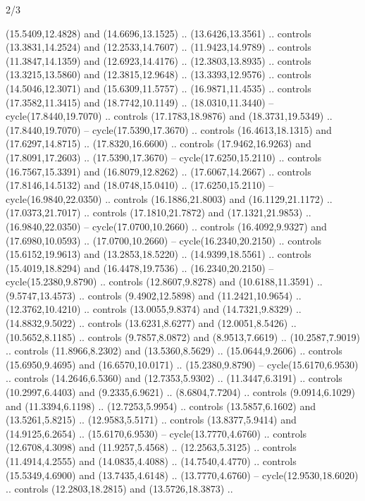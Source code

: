 \begin{flagdescription}{2/3}
\begin{scope}[yshift=\flagwidth,scale=\flagwidth/1241.93737]
\begin{scope}[y=-1mm, x=1mm,draw=gold,fill=blue,line join=miter,miter limit=4,line width=1.8\lw]
\begin{scope}[y=1mm, x=1mm, yscale=-1,shift={(573.68mm+\str,145.75)}]
\begin{scope}[scale=1.35,shift={(-9,-3)}]
\begin{scope}[scale=0.55]
\begin{scope}[scale=1.333]
    (15.5409,12.4828) and (14.6696,13.1525) .. (13.6426,13.3561) .. controls
    (13.3831,14.2524) and (12.2533,14.7607) .. (11.9423,14.9789) .. controls
    (11.3847,14.1359) and (12.6923,14.4176) .. (12.3803,13.8935) .. controls
    (13.3215,13.5860) and (12.3815,12.9648) .. (13.3393,12.9576) .. controls
    (14.5046,12.3071) and (15.6309,11.5757) .. (16.9871,11.4535) .. controls
    (17.3582,11.3415) and (18.7742,10.1149) .. (18.0310,11.3440) --
    cycle(17.8440,19.7070) .. controls (17.1783,18.9876) and (18.3731,19.5349) ..
    (17.8440,19.7070) -- cycle(17.5390,17.3670) .. controls (16.4613,18.1315) and
    (17.6297,14.8715) .. (17.8320,16.6600) .. controls (17.9462,16.9263) and
    (17.8091,17.2603) .. (17.5390,17.3670) -- cycle(17.6250,15.2110) .. controls
    (16.7567,15.3391) and (16.8079,12.8262) .. (17.6067,14.2667) .. controls
    (17.8146,14.5132) and (18.0748,15.0410) .. (17.6250,15.2110) --
    cycle(16.9840,22.0350) .. controls (16.1886,21.8003) and (16.1129,21.1172) ..
    (17.0373,21.7017) .. controls (17.1810,21.7872) and (17.1321,21.9853) ..
    (16.9840,22.0350) -- cycle(17.0700,10.2660) .. controls (16.4092,9.9327) and
    (17.6980,10.0593) .. (17.0700,10.2660) -- cycle(16.2340,20.2150) .. controls
    (15.6152,19.9613) and (13.2853,18.5220) .. (14.9399,18.5561) .. controls
    (15.4019,18.8294) and (16.4478,19.7536) .. (16.2340,20.2150) --
    cycle(15.2380,9.8790) .. controls (12.8607,9.8278) and (10.6188,11.3591) ..
    (9.5747,13.4573) .. controls (9.4902,12.5898) and (11.2421,10.9654) ..
    (12.3762,10.4210) .. controls (13.0055,9.8374) and (14.7321,9.8329) ..
    (14.8832,9.5022) .. controls (13.6231,8.6277) and (12.0051,8.5426) ..
    (10.5652,8.1185) .. controls (9.7857,8.0872) and (8.9513,7.6619) ..
    (10.2587,7.9019) .. controls (11.8966,8.2302) and (13.5360,8.5629) ..
    (15.0644,9.2606) .. controls (15.6950,9.4695) and (16.6570,10.0171) ..
    (15.2380,9.8790) -- cycle(15.6170,6.9530) .. controls (14.2646,6.5360) and
    (12.7353,5.9302) .. (11.3447,6.3191) .. controls (10.2997,6.4403) and
    (9.2335,6.9621) .. (8.6804,7.7204) .. controls (9.0914,6.1029) and
    (11.3394,6.1198) .. (12.7253,5.9954) .. controls (13.5857,6.1602) and
    (13.5261,5.8215) .. (12.9583,5.5171) .. controls (13.8377,5.9414) and
    (14.9125,6.2654) .. (15.6170,6.9530) -- cycle(13.7770,4.6760) .. controls
    (12.6708,4.3098) and (11.9257,5.4568) .. (12.2563,5.3125) .. controls
    (11.4914,4.2555) and (14.0835,4.4088) .. (14.7540,4.4770) .. controls
    (15.5349,4.6900) and (13.7435,4.6148) .. (13.7770,4.6760) --
    cycle(12.9530,18.6020) .. controls (12.2803,18.2815) and (13.5726,18.3873) ..

\end{scope}
\end{scope}
\end{scope}
\end{scope}
\end{scope}
\end{scope}
\end{flagdescription}
